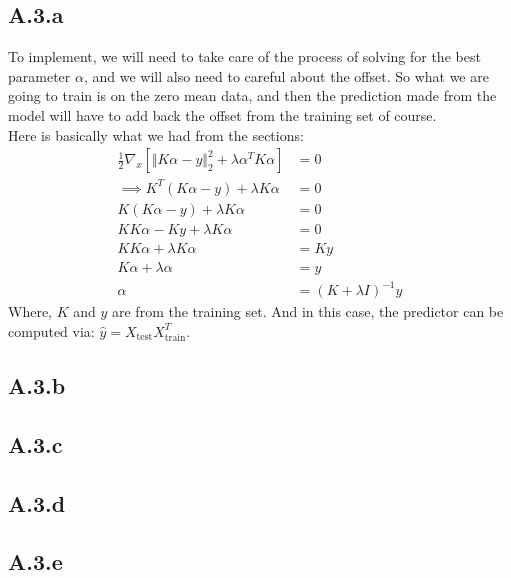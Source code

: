 \documentclass[]{article}
\begin{document}
    \subsection*{A.3.a}
        To implement, we will need to take care of the process of solving for the best parameter $\alpha$, and we will also need to careful about the offset. So what we are going to train is on the zero mean data, and then the prediction made from the model will have to add back the offset from the training set of course. 
        \\
        Here is basically what we had from the sections: 
        \begin{align*}\tag{A.3.a}\label{eqn:A.3.a}
            \frac{1}{2}\nabla_x[\Vert K\alpha - y\Vert_2^2 + \lambda \alpha^T K \alpha] &= 0
            \\
            \implies K^T(K\alpha - y) + \lambda K\alpha &= 0
            \\
            K(K\alpha - y) + \lambda K\alpha &= 0
            \\
            KK\alpha - Ky + \lambda K\alpha &= 0
            \\
            KK\alpha + \lambda K\alpha &= Ky
            \\
            K \alpha + \lambda \alpha &= y
            \\
            \alpha &= (K + \lambda I)^{-1}y
        \end{align*}
        Where, $K$ and $y$ are from the training set. And in this case, the predictor can be computed via: $\hat{y} = X_\text{test}X^T_{\text{train}}$.
    \subsection*{A.3.b}
        

    \subsection*{A.3.c}
    
    \subsection*{A.3.d}
    \subsection*{A.3.e}
    
    
\end{document}
